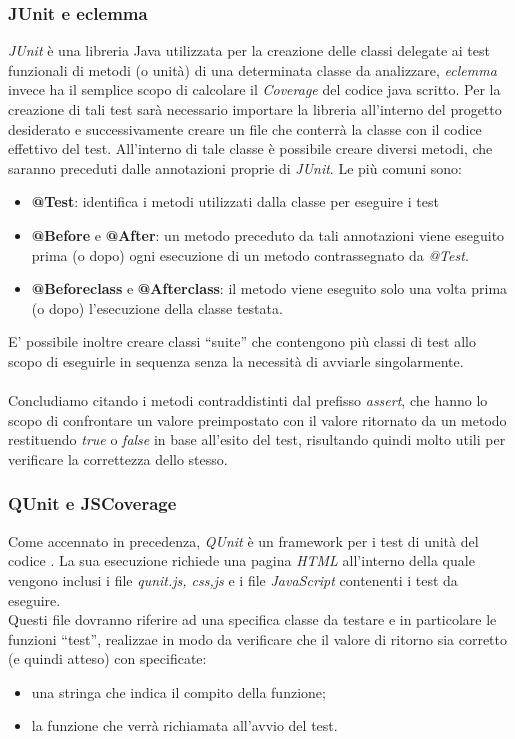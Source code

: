 {\subsubsection{JUnit e eclemma}
\textit{JUnit} è una libreria Java utilizzata per la creazione delle classi delegate ai test funzionali di metodi (o unità) di una determinata classe da analizzare, \textit{eclemma} invece ha il semplice scopo di calcolare il \textit{Coverage} del codice java scritto.
Per la creazione di tali test sarà necessario importare la libreria all'interno del progetto desiderato e successivamente creare un file che conterrà la classe con il codice effettivo del test.
All'interno di tale classe è possibile creare diversi metodi, che saranno preceduti dalle annotazioni proprie di \textit{JUnit}. Le più comuni sono:
\begin{itemize}
\item \textbf{@Test}: identifica i metodi utilizzati dalla classe per eseguire i test
\item \textbf{@Before} e \textbf{@After}: un metodo preceduto da tali annotazioni viene eseguito prima (o dopo) ogni esecuzione di un metodo contrassegnato da \textit{@Test}.
\item \textbf{@Beforeclass} e \textbf{@Afterclass}: il metodo viene eseguito solo una volta prima (o dopo) l'esecuzione della classe testata.
\end{itemize}
E' possibile inoltre creare classi ``suite'' che contengono più classi di test allo scopo di eseguirle in sequenza senza la necessità di avviarle singolarmente.\\\\
Concludiamo citando i metodi contraddistinti dal prefisso \textit{assert}, che hanno lo scopo di confrontare un valore preimpostato con il valore ritornato da un metodo restituendo \textit{true} o \textit{false} in base all'esito del test, risultando quindi molto utili per verificare la correttezza dello stesso.

\subsubsection{QUnit e JSCoverage}
Come accennato in precedenza, \textit{QUnit} è un framework per i test di unità del codice . La sua esecuzione richiede una pagina \textit{HTML} all'interno della quale vengono inclusi i file \textit{qunit.js, css,js} e i file \textit{JavaScript} contenenti i test da eseguire.\\
Questi file dovranno riferire ad una specifica classe da testare e in particolare le funzioni ``test'', realizzae in modo da verificare che il valore di ritorno sia corretto (e quindi atteso) con specificate:
\begin{itemize}
\item una stringa che indica il compito della funzione;
\item la funzione che verrà richiamata all'avvio del test.
\end{itemize}

}
